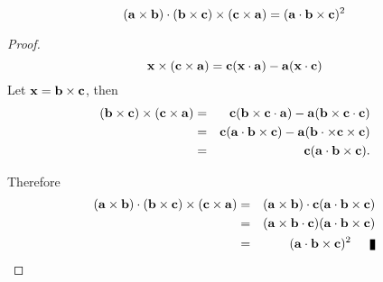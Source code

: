\begin{theorem}
\[ ({\bf a} \times {\bf b})\cdot ({\bf b}\times {\bf c}) \times ({\bf c}\times {\bf a}) = ({\bf a}\cdot {\bf b} \times {\bf c})^2 \]
\end{theorem}

\begin{proof}
\[ {\bf x} \times ({\bf c}\times {\bf a}) = {\bf c}({\bf x}\cdot {\bf a}) - {\bf a}({\bf x}\cdot {\bf c}) \]
Let ${\bf x} = {\bf b} \times {\bf c}$, then 
\begin{eqnarray*}
({\bf b}\times {\bf c}) \times ({\bf c}\times {\bf a}) & =&  {\bf c}({\bf b}\times {\bf c} \cdot {\bf a}) - {\bf a}({\bf b}\times{\bf c}\cdot {\bf c}) \\
                                                                                   & =&  {\bf c}({\bf a}\cdot {\bf b} \times {\bf c}) - {\bf a}({\bf b}\cdot \times{\bf c}\times {\bf c}) \\
                                                                                   & =&  {\bf c}({\bf a}\cdot {\bf b} \times {\bf c}).
\end{eqnarray*}

Therefore 
\begin{eqnarray*}
({\bf a} \times {\bf b})\cdot ({\bf b}\times {\bf c}) \times ({\bf c}\times {\bf a}) & =&  ({\bf a} \times {\bf b})\cdot {\bf c}({\bf a}\cdot {\bf b} \times {\bf c})\\
                                                                                                                                & =&  ({\bf a} \times {\bf b}\cdot {\bf c})({\bf a}\cdot {\bf b} \times {\bf c})\\
                                                                                   & =&  ({\bf a}\cdot {\bf b} \times {\bf c})^2 \qed\\
\end{eqnarray*}
\end{proof}